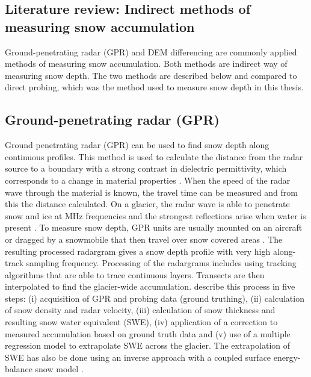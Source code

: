 \documentclass{sfuthesis}
\begin{document}
\begin{appendices}
\chapter{Literature review: Indirect methods of measuring snow accumulation }
\label{app:snow_measure_methods}

Ground-penetrating radar (GPR) and DEM differencing are commonly applied methods of measuring snow accumulation. Both methods are indirect way of measuring snow depth. The two methods are described below and compared to direct probing, which was the method used to measure snow depth in this thesis. 

\section{Ground-penetrating radar (GPR)}

Ground penetrating radar (GPR) can be used to find snow depth along continuous profiles. This method is used to calculate the distance from the radar source to a boundary with a strong contrast in dielectric permittivity, which corresponds to a change in material properties \citep{Sold2013}. When the speed of the radar wave through the material is known, the travel time can be measured and from this the distance calculated. On a glacier, the radar wave is able to penetrate snow and ice at MHz frequencies and the strongest reflections arise when water is present \citep{Sold2013}. To measure snow depth, GPR units are usually mounted on an aircraft or dragged by a snowmobile that then travel over snow covered areas \citep{Machguth2006, McGrath2015}. The resulting processed radargram gives a snow depth profile with very high along-track sampling frequency. Processing of the radargrams includes using tracking algorithms that are able to trace continuous layers. Transects are then interpolated to find the glacier-wide accumulation. \cite{McGrath2015} describe this process in five steps: (i) acquisition of GPR and probing data (ground truthing), (ii) calculation of snow density and radar velocity, (iii) calculation of snow thickness and resulting snow water equivalent (SWE), (iv) application of a correction to measured accumulation based on ground truth data and (v) use of a multiple regression model to extrapolate SWE across the glacier. The extrapolation of SWE has also be done using an inverse approach with a coupled surface energy-balance snow model \citep{Pelt2014}.


\end{appendices}
\end{document}
